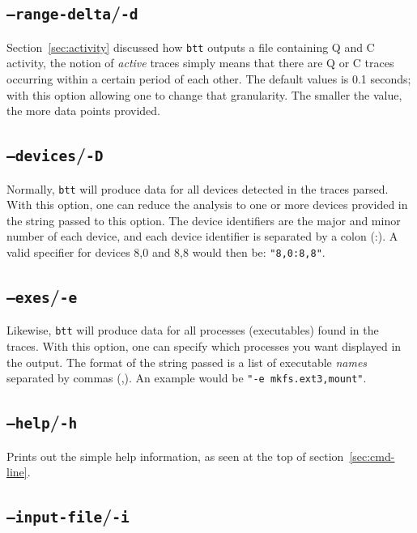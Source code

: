\documentclass{article}
\begin{document}
\subsection{\label{sec:o-d}\texttt{--range-delta}/\texttt{-d}}

  Section~\ref{sec:activity} discussed how \texttt{btt} outputs a file
  containing Q and C activity, the notion of \emph{active} traces simply
  means that there are Q or C traces occurring within a certain period
  of each other. The default values is 0.1 seconds; with this option
  allowing one to change that granularity. The smaller the value, the
  more data points provided.

\subsection{\label{sec:o-D}\texttt{--devices}/\texttt{-D}}

  Normally, \texttt{btt} will produce data for all devices detected in
  the traces parsed. With this option, one can reduce the analysis to
  one or more devices provided in the string passed to this option. The
  device identifiers are the major and minor number of each device, and
  each device identifier is separated by a colon (:). A valid specifier
  for devices 8,0 and 8,8 would then be: \texttt{"8,0:8,8"}.

\subsection{\label{sec:o-e}\texttt{--exes}/\texttt{-e}}

  Likewise, \texttt{btt} will produce data for all processes (executables)
  found in the traces. With this option, one can specify which processes
  you want displayed in the output. The format of the string passed is
  a list of executable \emph{names} separated by commas (,). An example
  would be \texttt{"-e mkfs.ext3,mount"}.

\subsection{\label{sec:o-h}\texttt{--help}/\texttt{-h}}

  Prints out the simple help information, as seen at the top of
  section~\ref{sec:cmd-line}.

\subsection{\label{sec:o-i}\texttt{--input-file}/\texttt{-i}}
\end{document}

